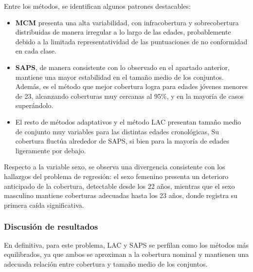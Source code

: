 Entre los métodos, se identifican algunos patrones destacables:

\begin{itemize}

    \item \textbf{MCM} presenta una alta variabilidad, con infracobertura y sobrecobertura distribuidas de manera irregular a lo largo de las edades, probablemente debido a la limitada representatividad de las puntuaciones de no conformidad en cada clase.
    
    
    \item \textbf{SAPS}, de manera consistente con lo observado en el apartado anterior, mantiene una mayor estabilidad en el tamaño medio de los conjuntos. Además, es el método que mejor cobertura logra para edades jóvenes menores de 23, alcanzando coberturas muy cercanas al 95\%, y en la mayoría de casos superándolo. 
    
    \item El resto de métodos adaptativos y el método LAC presentan tamaño medio de conjunto muy variables para las distintas edades cronológicas, Su cobertura fluctúa alrededor de SAPS, si bien para la mayoría de edades ligeramente por debajo.
    
\end{itemize}

Respecto a la variable sexo, se observa una divergencia consistente con los hallazgos del problema de regresión: el sexo femenino presenta un deterioro anticipado de la cobertura, detectable desde los 22 años, mientras que el sexo masculino mantiene coberturas adecuadas hasta los 23 años, donde registra su primera caída significativa. 


\subsubsection{Discusión de resultados}


En definitiva, para este problema, LAC y SAPS se perfilan como los métodos más equilibrados, ya que ambos se aproximan a la cobertura nominal y mantienen una adecuada relación entre cobertura y tamaño medio de los conjuntos.

